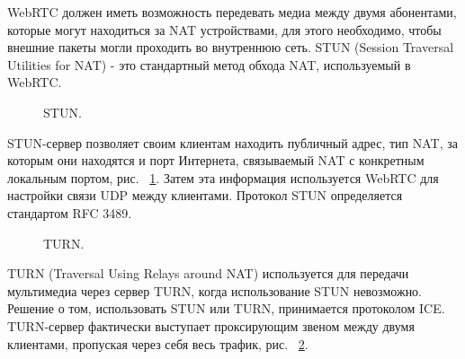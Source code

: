 WebRTC должен иметь возможность передевать медиа между двумя абонентами, которые могут находиться за NAT устройствами, для этого необходимо, чтобы внешние пакеты могли проходить во внутреннюю сеть. STUN (Session Traversal Utilities for NAT) - это стандартный метод обхода NAT, используемый в WebRTC.

\begin{figure}[ht]
\begin{center}

\caption{
\label{stun}
     STUN.}
\end {center}
\end {figure}


STUN-сервер позволяет своим клиентам находить публичный адрес, тип NAT, за которым они находятся и порт Интернета, связываемый NAT с конкретным локальным портом, рис. ~\ref{stun}. Затем эта информация используется WebRTC для настройки связи UDP между клиентами. Протокол STUN определяется стандартом RFC 3489.

\begin{figure}[ht]
\begin{center}

\caption{
\label{turn}
     TURN.}
\end {center}
\end {figure}

TURN (Traversal Using Relays around NAT) используется для передачи мультимедиа через сервер TURN, когда использование STUN невозможно. Решение о том, использовать STUN или TURN, принимается протоколом ICE. TURN-сервер фактически выступает проксирующим звеном между двумя клиентами, пропуская через себя весь трафик, рис. ~\ref{turn}.

